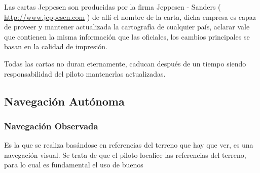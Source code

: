 Las cartas Jeppesen son producidas por la firma Jeppesen - Sanders
(
\url{http://www.jeppesen.com} 
) de all\'i el nombre de la carta, dicha empresa
es capaz de proveer y mantener actualizada la cartograf\'ia de cualquier pa\'is,
aclarar vale que contienen la misma informaci\'on que las oficiales, los cambios
principales se basan en la calidad de impresi\'on.

Todas las cartas no duran eternamente, caducan despu\'es de un tiempo siendo
responsabilidad del piloto mantenerlas actualizadas.



\subsection{Navegaci\'on Aut\'onoma}
\label{sec:06.navegacion.autonoma}

\subsubsection{Navegaci\'on Observada }%
\label{sec:06.navegacion.observada}

 Es la que se realiza bas\'andose en
referencias del terreno que hay que ver, es una navegaci\'on visual.
Se trata de que el piloto localice las referencias del terreno, para lo
cual es fundamental el uso de buenos 

